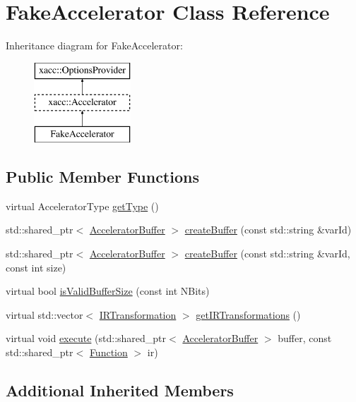 \hypertarget{a02496}{}\section{Fake\+Accelerator Class Reference}
\label{a02496}
Inheritance diagram for Fake\+Accelerator\+:\begin{figure}[H]
\begin{center}
\leavevmode
\includegraphics[height=3.000000cm]{a02496}
\end{center}
\end{figure}
\subsection*{Public Member Functions}
\begin{DoxyCompactItemize}
\item 
virtual Accelerator\+Type \hyperlink{a02496_abde88dbbf4410bf1c2c3826999e32d47}{get\+Type} ()
\item 
std\+::shared\+\_\+ptr$<$ \hyperlink{a02444}{Accelerator\+Buffer} $>$ \hyperlink{a02496_ae39580fdc83ce9f4df0967382398950e}{create\+Buffer} (const std\+::string \&var\+Id)
\item 
std\+::shared\+\_\+ptr$<$ \hyperlink{a02444}{Accelerator\+Buffer} $>$ \hyperlink{a02496_a09f29b893338dfb0a56dd183cf6949fe}{create\+Buffer} (const std\+::string \&var\+Id, const int size)
\item 
virtual bool \hyperlink{a02496_a7a6e63d282dc38fc53c3f3d46ca2ba9b}{is\+Valid\+Buffer\+Size} (const int N\+Bits)
\item 
virtual std\+::vector$<$ \hyperlink{a02484}{I\+R\+Transformation} $>$ \hyperlink{a02496_a6be5485b52606b4543d7e08eda4d6b69}{get\+I\+R\+Transformations} ()
\item 
virtual void \hyperlink{a02496_a22c71bda017235865f1b7d4cc5e911fa}{execute} (std\+::shared\+\_\+ptr$<$ \hyperlink{a02444}{Accelerator\+Buffer} $>$ buffer, const std\+::shared\+\_\+ptr$<$ \hyperlink{a02456}{Function} $>$ ir)
\end{DoxyCompactItemize}
\subsection*{Additional Inherited Members}


